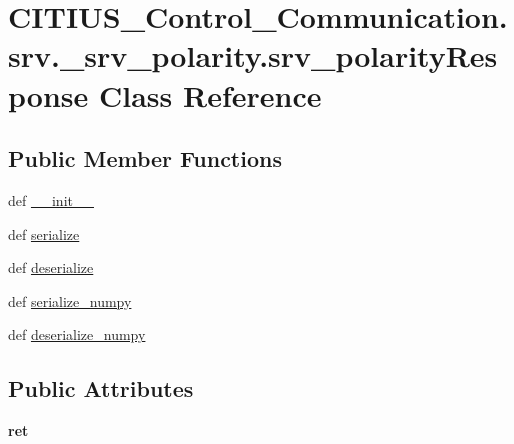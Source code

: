 \hypertarget{class_c_i_t_i_u_s___control___communication_1_1srv_1_1__srv__polarity_1_1srv__polarity_response}{\section{\-C\-I\-T\-I\-U\-S\-\_\-\-Control\-\_\-\-Communication.\-srv.\-\_\-srv\-\_\-polarity.\-srv\-\_\-polarity\-Response \-Class \-Reference}
\label{class_c_i_t_i_u_s___control___communication_1_1srv_1_1__srv__polarity_1_1srv__polarity_response}
}
\subsection*{\-Public \-Member \-Functions}
\begin{DoxyCompactItemize}
\item 
def \hyperlink{class_c_i_t_i_u_s___control___communication_1_1srv_1_1__srv__polarity_1_1srv__polarity_response_a181af52196aee5bfba2b6f43be9a7147}{\-\_\-\-\_\-init\-\_\-\-\_\-}
\item 
def \hyperlink{class_c_i_t_i_u_s___control___communication_1_1srv_1_1__srv__polarity_1_1srv__polarity_response_ac03b0cb68e79a04ad394d30358714477}{serialize}
\item 
def \hyperlink{class_c_i_t_i_u_s___control___communication_1_1srv_1_1__srv__polarity_1_1srv__polarity_response_a6d8e5f134d88215d8e7ddbbb7a54de1d}{deserialize}
\item 
def \hyperlink{class_c_i_t_i_u_s___control___communication_1_1srv_1_1__srv__polarity_1_1srv__polarity_response_a90b3e9e9fe1e3f3201d75555e98af725}{serialize\-\_\-numpy}
\item 
def \hyperlink{class_c_i_t_i_u_s___control___communication_1_1srv_1_1__srv__polarity_1_1srv__polarity_response_ab56d380aa9f7802649a2692605a86f2d}{deserialize\-\_\-numpy}
\end{DoxyCompactItemize}
\subsection*{\-Public \-Attributes}
\begin{DoxyCompactItemize}
\item 
\hypertarget{class_c_i_t_i_u_s___control___communication_1_1srv_1_1__srv__polarity_1_1srv__polarity_response_abc5f6d019d04341a2811822ea973cba0}{{\bfseries ret}}\label{class_c_i_t_i_u_s___control___communication_1_1srv_1_1__srv__polarity_1_1srv__polarity_response_abc5f6d019d04341a2811822ea973cba0}

\end{DoxyCompactItemize}
